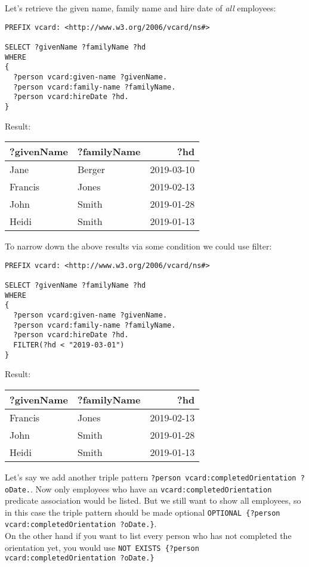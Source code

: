 \documentclass[11pt]{article}
\begin{document}
Let's retrieve the given name, family name and hire date of \emph{all} employees:
\lstset{breaklines=true,language=SQL,label= ,caption= ,captionpos=b,numbers=none}
\begin{lstlisting}
PREFIX vcard: <http://www.w3.org/2006/vcard/ns#>

SELECT ?givenName ?familyName ?hd
WHERE
{
  ?person vcard:given-name ?givenName.
  ?person vcard:family-name ?familyName.
  ?person vcard:hireDate ?hd.
}
\end{lstlisting}
Result:
\begin{center}
\begin{tabular}{llr}
?givenName & ?familyName & ?hd\\
\hline
Jane & Berger & 2019-03-10\\
Francis & Jones & 2019-02-13\\
John & Smith & 2019-01-28\\
Heidi & Smith & 2019-01-13\\
\end{tabular}
\end{center}
To narrow down the above results via some condition we could use filter:
\lstset{breaklines=true,language=SQL,label= ,caption= ,captionpos=b,numbers=none}
\begin{lstlisting}
PREFIX vcard: <http://www.w3.org/2006/vcard/ns#>

SELECT ?givenName ?familyName ?hd
WHERE
{
  ?person vcard:given-name ?givenName.
  ?person vcard:family-name ?familyName.
  ?person vcard:hireDate ?hd.
  FILTER(?hd < "2019-03-01")
}
\end{lstlisting}
Result:
\begin{center}
\begin{tabular}{llr}
?givenName & ?familyName & ?hd\\
\hline
Francis & Jones & 2019-02-13\\
John & Smith & 2019-01-28\\
Heidi & Smith & 2019-01-13\\
\end{tabular}
\end{center}
Let's say we add another triple pattern \texttt{?person vcard:completedOrientation ?oDate.}. Now only employees who have an \texttt{vcard:completedOrientation} predicate association would be listed. But we still want to show all employees, so in this case the triple pattern should be made optional \texttt{OPTIONAL \{?person vcard:completedOrientation ?oDate.\}}.\\
On the other hand if you want to list every person who has not completed the orientation yet, you would use \texttt{NOT EXISTS \{?person vcard:completedOrientation ?oDate.\}}
\end{document}
